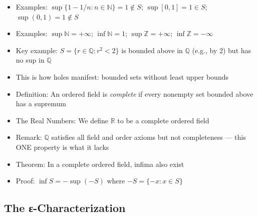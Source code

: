 \documentclass[
  10pt,
  letterpaper,
]{scrbook}
\providecommand{\tightlist}{%
  \setlength{\itemsep}{0pt}\setlength{\parskip}{0pt}}
\newcommand{\ZZ}{\mathbb{Z}}
\newcommand{\NN}{\mathbb{N}}
\newcommand{\QQ}{\mathbb{Q}}
\newcommand{\RR}{\mathbb{R}}
\begin{document}
\begin{itemize}
  \begin{itemize}
  \tightlist
  \item
    If \(S\) is nonempty and unbounded above, write \(\sup S = +\infty\)
  \item
    If \(S\) is nonempty and unbounded below, write \(\inf S = -\infty\)
  \item
    With this convention, every nonempty set has a sup and inf (possibly
    \(\pm\infty\))
  \end{itemize}
\item
  Examples: \(\sup\{1 - 1/n : n \in \NN\} = 1 \notin S\);
  \(\sup[0,1] = 1 \in S\); \(\sup(0,1) = 1 \notin S\)
\item
  Examples: \(\sup \NN = +\infty\); \(\inf \NN = 1\);
  \(\sup \ZZ = +\infty\); \(\inf \ZZ = -\infty\)
\item
  Key example: \(S = \{r \in \QQ : r^2 < 2\}\) is bounded above in
  \(\QQ\) (e.g., by 2) but has no sup in \(\QQ\)
\item
  This is how holes manifest: bounded sets without least upper bounds
\item
  Definition: An ordered field is \emph{complete} if every nonempty set
  bounded above has a supremum
\item
  The Real Numbers: We define \(\RR\) to be a complete ordered field
\item
  Remark: \(\QQ\) satisfies all field and order axioms but not
  completeness --- this ONE property is what it lacks
\item
  Theorem: In a complete ordered field, infima also exist
\item
  Proof: \(\inf S = -\sup(-S)\) where \(-S = \{-x : x \in S\}\)
\end{itemize}

\subsection{The ε-Characterization}\label{the-ux3b5-characterization}
\end{document}
